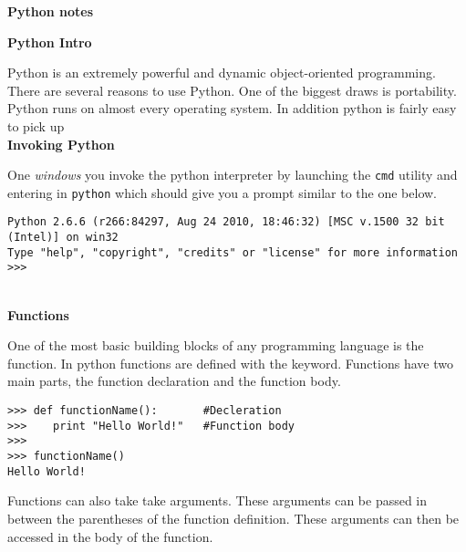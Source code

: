 \documentclass[letterpaper,11pt]{article}
\begin{document}
\begin{flushleft}
    \LARGE{\textbf{Python notes}}
\end{flushleft}
\textbf{Python Intro}
\par{Python is an extremely powerful and dynamic object-oriented programming.
There are several reasons to use Python. One of the biggest draws is
portability. Python runs on almost every operating system. In addition python is
fairly easy to pick up}
\\
\textbf{Invoking Python}
\par{One \emph{windows} you invoke the python interpreter by launching the
\texttt{cmd} utility and entering in \texttt{python} which should give you a
prompt similar to the one below.}
\\
\begin{minipage}{1\textwidth}
    \begin{tcolorbox}
        \begin{footnotesize}
\begin{verbatim}
Python 2.6.6 (r266:84297, Aug 24 2010, 18:46:32) [MSC v.1500 32 bit (Intel)] on win32
Type "help", "copyright", "credits" or "license" for more information
>>>
            \end{verbatim}
        \end{footnotesize}
    \end{tcolorbox}
\end{minipage}
\\
\textbf{Functions}
\par{One of the most basic building blocks of any programming language is the
function. In python functions are defined with the  keyword.
Functions have two main parts, the function declaration and the function body. }
\\
\begin{minipage}{.5\textwidth}
    \begin{tcolorbox}
        \begin{footnotesize}
            \begin{verbatim}
>>> def functionName():       #Decleration
>>>    print "Hello World!"   #Function body
>>>
>>> functionName()
Hello World!
            \end{verbatim}
        \end{footnotesize}
    \end{tcolorbox}
\end{minipage}
\par{Functions can also take take arguments. These arguments can be passed in
between the parentheses of the function definition. These arguments can then be
accessed in the body of the function.}
\end{document}
